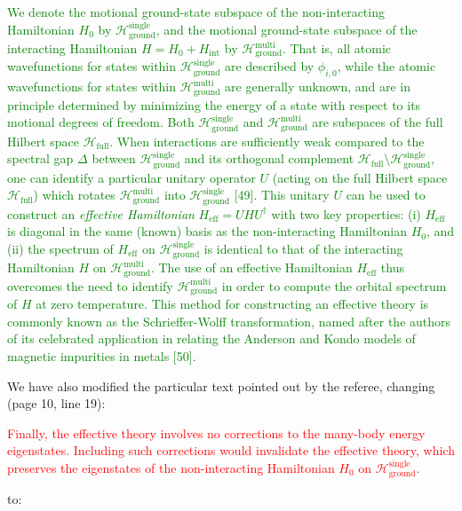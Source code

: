 \documentclass[preprint]{revtex4-1}
\renewcommand{\t}{\text} %
\renewcommand{\H}{\mathcal{H}}
\newcommand{\1}{\mathds{1}}
\newcommand{\red}[1]{\textcolor{red}{#1}}
\newcommand{\green}[1]{\textcolor{green}{#1}}
\begin{document}
\begin{enumerate}
  \green{We denote the motional ground-state subspace of the
    non-interacting Hamiltonian $H_0$ by
    $\H_{\t{ground}}^{\t{single}}$, and the motional ground-state
    subspace of the interacting Hamiltonian $H = H_0 + H_{\t{int}}$ by
    $\H_{\t{ground}}^{\t{multi}}$.  That is, all atomic wavefunctions
    for states within $\H_{\t{ground}}^{\t{single}}$ are described by
    $\phi_{i,0}$, while the atomic wavefunctions for states within
    $\H_{\t{ground}}^{\t{multi}}$ are generally unknown, and are in
    principle determined by minimizing the energy of a state with
    respect to its motional degrees of freedom.  Both
    $\H_{\t{ground}}^{\t{single}}$ and $\H_{\t{ground}}^{\t{multi}}$
    are subspaces of the full Hilbert space $\H_{\t{full}}$.  When
    interactions are sufficiently weak compared to the spectral gap
    $\Delta$ between $\H_{\t{ground}}^{\t{single}}$ and its orthogonal
    complement $\H_{\t{full}}\setminus\H_{\t{ground}}^{\t{single}}$,
    one can identify a particular unitary operator $U$ (acting on the
    full Hilbert space $\H_{\t{full}}$) which rotates
    $\H_{\t{ground}}^{\t{multi}}$ into $\H_{\t{ground}}^{\t{single}}$
    [49].  This unitary $U$ can be used to construct an {\it effective
      Hamiltonian} $H_{\t{eff}} = U H U^\dag$ with two key properties:
    (i) $H_{\t{eff}}$ is diagonal in the same (known) basis as the
    non-interacting Hamiltonian $H_0$, and (ii) the spectrum of
    $H_{\t{eff}}$ on $\H_{\t{ground}}^{\t{single}}$ is identical to
    that of the interacting Hamiltonian $H$ on
    $\H_{\t{ground}}^{\t{multi}}$.  The use of an effective
    Hamiltonian $H_{\t{eff}}$ thus overcomes the need to identify
    $\H_{\t{ground}}^{\t{multi}}$ in order to compute the orbital
    spectrum of $H$ at zero temperature.  This method for constructing
    an effective theory is commonly known as the Schrieffer-Wolff
    transformation, named after the authors of its celebrated
    application in relating the Anderson and Kondo models of magnetic
    impurities in metals [50].}

  We have also modified the particular text pointed out by the
  referee, changing (page 10, line 19):

  \red{Finally, the effective theory involves no corrections to the
    many-body energy eigenstates.  Including such corrections would
    invalidate the effective theory, which preserves the eigenstates
    of the non-interacting Hamiltonian $H_0$ on
    $\H_{\t{ground}}^{\t{single}}$.}

  to:


\end{enumerate}
\end{document}
